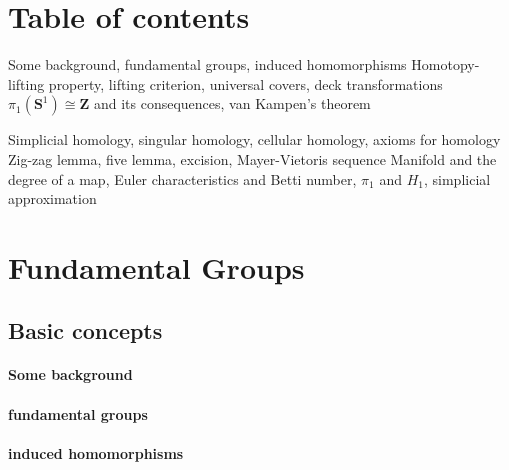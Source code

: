 \documentclass[11pt]{article}
\theoremstyle{definition}
\theoremstyle{plain}
\newcommand{\Z}{\mathbf{Z}}
\newcommand{\s}{\mathbf{S}}
\newcommand{\forceindent}{\leavevmode{\parindent=1.5em\indent}}
\begin{document}
\section*{Table of contents}

\forceindent\forceindent\forceindent Some background, fundamental groups, induced homomorphisms
\forceindent\forceindent\forceindent Homotopy-lifting property, lifting criterion, universal covers, deck transformations
\forceindent\forceindent\forceindent $\pi_1(\s^1)\cong\Z$ and its consequences, van Kampen's theorem

\forceindent\forceindent\forceindent Simplicial homology, singular homology, cellular homology, axioms for homology
\forceindent\forceindent\forceindent Zig-zag lemma, five lemma, excision, Mayer-Vietoris sequence
\forceindent\forceindent\forceindent Manifold and the degree of a map, Euler characteristics and Betti number, $\pi_1$ and $H_1$,\newline
\forceindent\forceindent\forceindent simplicial approximation


\newpage
\section{Fundamental Groups}

\subsection{Basic concepts}

\paragraph{Some background}

\paragraph{fundamental groups}

\paragraph{induced homomorphisms}
\end{document}
